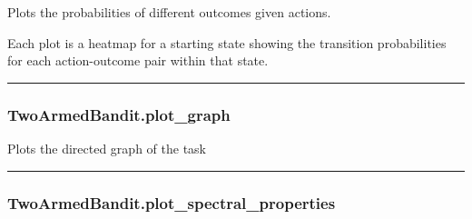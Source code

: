 Plots the probabilities of different outcomes given actions.

Each plot is a heatmap for a starting state showing the transition
probabilities for each action-outcome pair within that state.

\begin{center}\rule{0.5\linewidth}{\linethickness}\end{center}

\hypertarget{twoarmedbandit.plot_graph}{%
\subsubsection{TwoArmedBandit.plot\_graph}\label{twoarmedbandit.plot_graph}}

\begin{Shaded}
\begin{Highlighting}[]
\OperatorTok{=}\OperatorTok{=}\OperatorTok{=}\OperatorTok{=}\OperatorTok{=}\OperatorTok{=}\OperatorTok{=}\OperatorTok{=}\NormalTok{)}
\end{Highlighting}
\end{Shaded}

Plots the directed graph of the task

\begin{center}\rule{0.5\linewidth}{\linethickness}\end{center}

\hypertarget{twoarmedbandit.plot_spectral_properties}{%
\subsubsection{TwoArmedBandit.plot\_spectral\_properties}\label{twoarmedbandit.plot_spectral_properties}}

\begin{Shaded}
\begin{Highlighting}[]
\OperatorTok{=}\OperatorTok{=}\OperatorTok{=}\NormalTok{)}
\end{Highlighting}
\end{Shaded}

